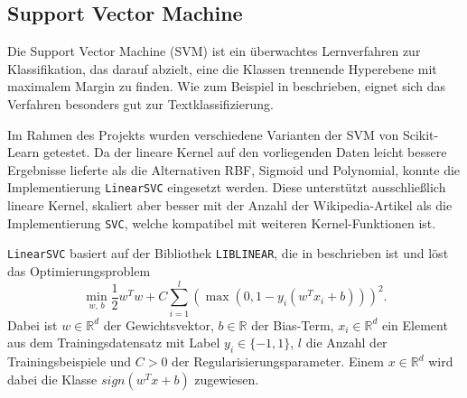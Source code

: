 \subsection{Support Vector Machine}
\label{SVM}

Die Support Vector Machine (SVM) ist ein überwachtes Lernverfahren zur Klassifikation, das darauf abzielt, eine die Klassen trennende Hyperebene mit maximalem Margin zu finden. Wie zum Beispiel in \cite{Joachims1998} beschrieben, eignet sich das Verfahren besonders gut zur Textklassifizierung.

Im Rahmen des Projekts wurden verschiedene Varianten der SVM von Scikit-Learn \cite{Pedregosa2011} getestet. Da der lineare Kernel auf den vorliegenden Daten leicht bessere Ergebnisse lieferte als die Alternativen RBF, Sigmoid und Polynomial, konnte die Implementierung \texttt{LinearSVC} eingesetzt werden. Diese unterstützt ausschließlich lineare Kernel, skaliert aber besser mit der Anzahl der Wikipedia-Artikel als die Implementierung \texttt{SVC}, welche kompatibel mit weiteren Kernel-Funktionen ist.

\texttt{LinearSVC} basiert auf der Bibliothek \texttt{LIBLINEAR}, die in \cite{Fan2008} beschrieben ist und löst das Optimierungsproblem
\begin{equation*}
  \min_{w,\, b} \frac{1}{2} w^T w + C \sum_{i=1}^{l} \left( \max(0, 1 - y_i (w^T x_i + b)) \right)^2.
\end{equation*}
Dabei ist \( w \in \mathbb{R}^d \) der Gewichtsvektor, \( b \in \mathbb{R} \) der Bias-Term, \( x_i \in \mathbb{R}^d \) ein Element aus dem Trainingsdatensatz mit Label \( y_i \in \{-1, 1\} \), \( l \) die Anzahl der Trainingsbeispiele und \( C > 0 \) der Regularisierungsparameter. Einem \( x \in \mathbb{R}^d \) wird dabei die Klasse \( sign(w^T x + b) \) zugewiesen.